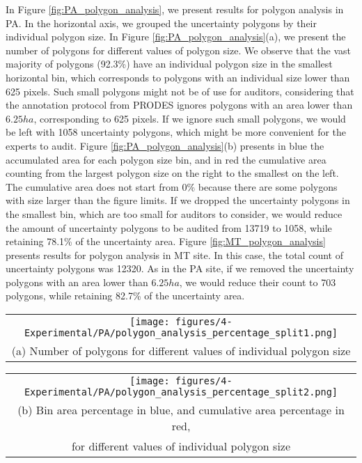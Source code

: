 In Figure \ref{fig:PA_polygon_analysis}, we present results for polygon analysis in PA. In the horizontal axis, we grouped the uncertainty polygons by their individual polygon size. In Figure \ref{fig:PA_polygon_analysis}(a), we present the number of polygons for different values of polygon size. We observe that the vast majority of polygons (92.3\%) have an individual polygon size in the smallest horizontal bin, which corresponds to polygons with an individual size lower than 625 pixels. Such small polygons might not be of use for auditors, considering that the annotation protocol from PRODES ignores polygons with an area lower than $6.25ha$, corresponding to 625 pixels. If we ignore such small polygons, we would be left with 1058 uncertainty polygons, which might be more convenient for the experts to audit. Figure \ref{fig:PA_polygon_analysis}(b) presents in blue the accumulated area for each polygon size bin, and in red the cumulative area counting from the largest polygon size on the right to the smallest on the left. The cumulative area does not start from 0\% because there are some polygons with size larger than the figure limits. If we dropped the uncertainty polygons in the smallest bin, which are too small for auditors to consider, we would reduce the amount of uncertainty polygons to be audited from 13719 to 1058, while retaining 78.1\% of the uncertainty area. 
Figure \ref{fig:MT_polygon_analysis} presents results for polygon analysis in MT site. In this case, the total count of uncertainty polygons was 12320. As in the PA site, if we removed the uncertainty polygons with an area lower than $6.25ha$, we would reduce their count to 703 polygons, while retaining 82.7\% of the uncertainty area. 


\begin{figure*}
  \centering
  \begin{tabular}{@{}c@{}}
    \texttt{[image: figures/4-Experimental/PA/polygon\_analysis\_percentage\_split1.png]} \\[\abovecaptionskip]
    \small (a) Number of polygons for different values of individual polygon size
  \end{tabular}

  \vspace{\floatsep}

  \begin{tabular}{@{}c@{}}
    \hspace*{28pt}\texttt{[image: figures/4-Experimental/PA/polygon\_analysis\_percentage\_split2.png]} \\[\abovecaptionskip]
    \small (b) Bin area percentage in blue, and cumulative area percentage in red, \\ for different values of individual polygon size
  \end{tabular}

  \caption{Polygon analysis for PA site.}\label{fig:PA_polygon_analysis}
\end{figure*}

